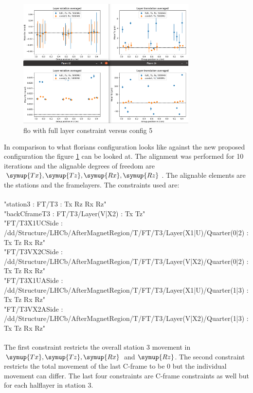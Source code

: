 \begin{figure}
  \centering
  \includegraphics[width=0.8\textwidth]{plots/august_13/combi5_layers_averaged.png}
  \caption{flo with full layer constraint versus config 5}
  \label{fig:floFullL_c5}
\end{figure}

In comparison to what florians configuration looks like against the new
proposed configuration the figure \ref{fig:floFullL_c5} can be looked at.
The alignment was performed for 10 iterations and the alignable degrees of
freedom are $\symup{Tx}, \symup{Tz}, \symup{Rx}, \symup{Rz}$. The alignable
elements are the stations and the framelayers.
The constraints used are: \\
\\
"station3 : FT/T3 : Tx Rz Rx Rz" \\
"backCframeT3 : FT/T3/Layer(V|X2) : Tx Tz" \\
"FT/T3X1UCSide : /dd/Structure/LHCb/AfterMagnetRegion/T/FT/T3/Layer(X1|U)/Quarter(0|2) : Tx Tz Rx Rz" \\
"FT/T3VX2CSide : /dd/Structure/LHCb/AfterMagnetRegion/T/FT/T3/Layer(V|X2)/Quarter(0|2) : Tx Tz Rx Rz" \\
"FT/T3X1UASide : /dd/Structure/LHCb/AfterMagnetRegion/T/FT/T3/Layer(X1|U)/Quarter(1|3) : Tx Tz Rx Rz" \\
"FT/T3VX2ASide : /dd/Structure/LHCb/AfterMagnetRegion/T/FT/T3/Layer(V|X2)/Quarter(1|3) : Tx Tz Rx Rz" \\
\\
The first constraint restricts the overall station 3 movement in $\symup{Tx}, \symup{Tz},
\symup{Rx}$ and $\symup{Rz}$. The second constraint restricts the total movement
of the last C-frame to be 0 but the individual movement can differ.
The last four constraints are C-frame constraints as well but for each halflayer in station 3.


